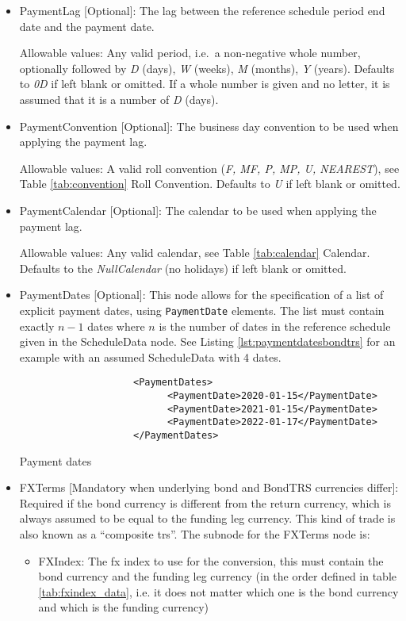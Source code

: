 \begin{itemize}
\begin{itemize}
  \item PaymentLag [Optional]: The lag between the reference schedule period end date and the payment date.
  
    Allowable values: Any valid period, i.e.\ a non-negative whole number, optionally followed by \emph{D} (days), \emph{W} (weeks), \emph{M} (months),
  \emph{Y} (years). Defaults to \emph{0D} if left blank or omitted. If a whole number is given and no letter, it is assumed that it is a number of  \emph{D} (days).
    
  \item PaymentConvention [Optional]: The business day convention to be used when applying the payment lag.
  
    Allowable values: A valid roll convention (\emph{F, MF, P, MP, U, NEAREST}), see Table \ref{tab:convention} Roll Convention. Defaults to \emph{U} if left blank or omitted.
    
  \item PaymentCalendar [Optional]: The calendar to be used when applying the payment lag.
  
    Allowable values: Any valid calendar, see Table \ref{tab:calendar} Calendar. Defaults to the \emph{NullCalendar} (no holidays) if left blank or omitted.

  \item PaymentDates [Optional]: This node allows for the specification of a list of explicit payment dates, using \lstinline!PaymentDate! elements.
    The list must contain exactly $n-1$ dates where $n$ is the number of dates in the reference schedule given in the ScheduleData node.
    See Listing \ref{lst:paymentdatesbondtrs} for an example with an assumed ScheduleData with 4 dates.

  \begin{listing}[H]
    \begin{verbatim}
                    <PaymentDates>
                          <PaymentDate>2020-01-15</PaymentDate>
                          <PaymentDate>2021-01-15</PaymentDate>
                          <PaymentDate>2022-01-17</PaymentDate>
                    </PaymentDates>
    \end{verbatim}
    \caption{Payment dates}
    \label{lst:paymentdatesbondtrs}
  \end{listing}


  \item FXTerms [Mandatory when underlying bond and BondTRS currencies differ]: Required if the bond currency is different from the return currency, which is always
    assumed to be equal to the funding leg currency. This kind of trade is also known as a ``composite trs''. The
    subnode for the FXTerms node is:
    \begin{itemize}
      \item FXIndex: The fx index to use for the conversion, this must contain the bond currency and the funding leg
        currency (in the order defined in table \ref{tab:fxindex_data}, i.e. it does not matter which one is the bond currency and which is the funding currency)
        

\end{itemize}
\end{itemize}
\end{itemize}
